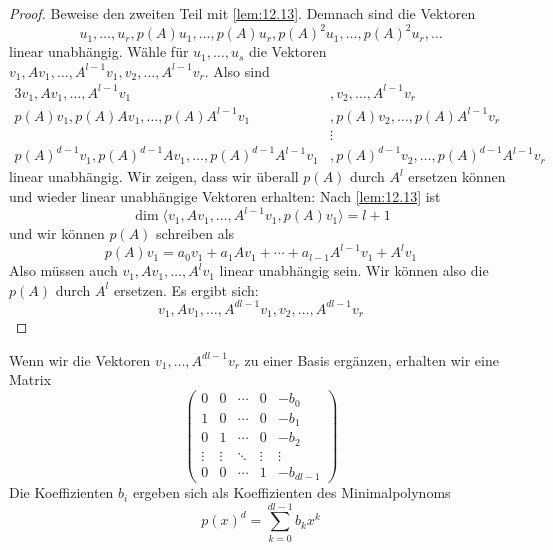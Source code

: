 \documentclass{mycourse}
\begin{document}
\begin{lem}
\begin{proof}
		Beweise den zweiten Teil mit \ref{lem:12.13}.
		Demnach sind die Vektoren
		\[
			u_1,\dotsc, u_r,p(A)u_1, \dotsc, p(A)u_r, p(A)^2u_1, \dotsc, p(A)^2u_r, \dotsc
		\]
		linear unabhängig.
		Wähle für $u_1,\dotsc, u_s$ die Vektoren $v_1,Av_1, \dotsc, A^{l-1}v_1,v_2,\dotsc, A^{l-1}v_r$.
		Also sind
		\begin{alignat*}{3}
			v_1, Av_1, \dotsc, A^{l-1}v_1 &, v_2, \dotsc, A^{l-1}v_r\\
			p(A)v_1, p(A)Av_1, \dotsc, p(A)A^{l-1}v_1 &, p(A)v_2, \dotsc, p(A)A^{l-1}v_r\\
										   &\vdots\\
			p(A)^{d-1}v_1, p(A)^{d-1}Av_1, \dotsc, p(A)^{d-1}A^{l-1}v_1 &, p(A)^{d-1}v_2, \dots, p(A)^{d-1}A^{l-1}v_r
		\end{alignat*}
		linear unabhängig.
		Wir zeigen, dass wir überall $p(A)$ durch $A^l$ ersetzen können und wieder linear unabhängige Vektoren erhalten:
		Nach \ref{lem:12.13} ist
		\[
			\dim \langle v_1, Av_1, \dotsc, A^{l-1}v_1, p(A)v_1\rangle = l+1
		\]
		und wir können $p(A)$ schreiben als
		\[
			p(A)v_1 = a_0v_1 + a_1Av_1 + \dotsb + a_{l-1}A^{l-1}v_1 + A^lv_1
		\]
		Also müssen auch $v_1, Av_1, \dotsc, A^{l}v_1$ linear unabhängig sein.
		Wir können also die $p(A)$ durch $A^l$ ersetzen.
		Es ergibt sich:
		\[	
			v_1, Av_1, \dotsc, A^{dl-1}v_1, v_2, \dotsc, A^{dl-1}v_r
		\]
	\end{proof}
\end{lem}

Wenn wir die Vektoren $v_1,\dotsc, A^{dl-1}v_r$ zu einer Basis ergänzen, erhalten wir eine Matrix
\[
	\begin{pmatrix}
		0 & 0 & \cdots & 0 & -b_0 \\
		1& 0 &\cdots & 0 & -b_1 \\
		0& 1 & \cdots & 0 & -b_2 \\
		\vdots & \vdots & \ddots & \vdots & \vdots \\
		0 & 0& \cdots & 1 &  -b_{dl-1}
	\end{pmatrix}
\]
Die Koeffizienten $b_i$ ergeben sich als Koeffizienten des Minimalpolynoms
\[
	p(x)^d = \sum_{k=0}^{dl-1}b_kx^k
\]
\end{document}
